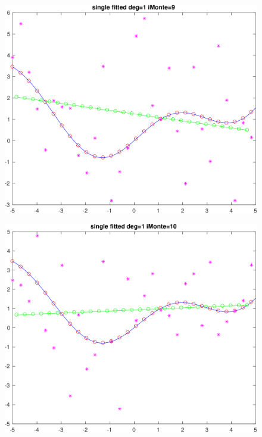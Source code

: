 \begin{figure}[h!]
\centering\includegraphics[scale=0.1]{single_poly_d_1_iMonte_9.png}
\end{figure}


\begin{figure}[h!]
\centering\includegraphics[scale=0.1]{single_poly_d_1_iMonte_10.png}
\end{figure}


